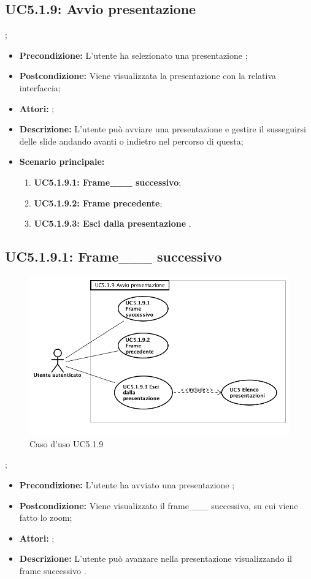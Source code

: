 \subsection{ UC5.1.9: Avvio presentazione }
;
\begin{itemize}
	\item \textbf{Precondizione:} L'utente ha selezionato una presentazione ;
	\item \textbf{Postcondizione:} Viene visualizzata la presentazione con la relativa interfaccia;
	\item \textbf{Attori:} ;
	\item \textbf{Descrizione:} L'utente può avviare una presentazione e gestire il susseguirsi delle slide andando avanti o indietro nel percorso di questa;
	\item \textbf{Scenario principale:}
	\begin{enumerate}
		\item \textbf{ UC5.1.9.1: Frame___ successivo};
		\item \textbf{ UC5.1.9.2: Frame precedente};
		\item \textbf{ UC5.1.9.3: Esci dalla presentazione }.
	\end{enumerate}
\end{itemize}
\subsection{ UC5.1.9.1: Frame___ successivo}

\begin{figure}[h]
	\begin{center}
	\includegraphics[scale=0.4]{diagram/UC5-1-9.png}
	\caption{Caso d'uso UC5.1.9}
	\end{center}
\end{figure};
\begin{itemize}
	\item \textbf{Precondizione:} L'utente ha avviato una presentazione ;
	\item \textbf{Postcondizione:} Viene visualizzato il frame___ successivo, su cui viene fatto lo zoom;
	\item \textbf{Attori:} ;
	\item \textbf{Descrizione:} L'utente può avanzare nella presentazione visualizzando il frame successivo .
\end{itemize}
